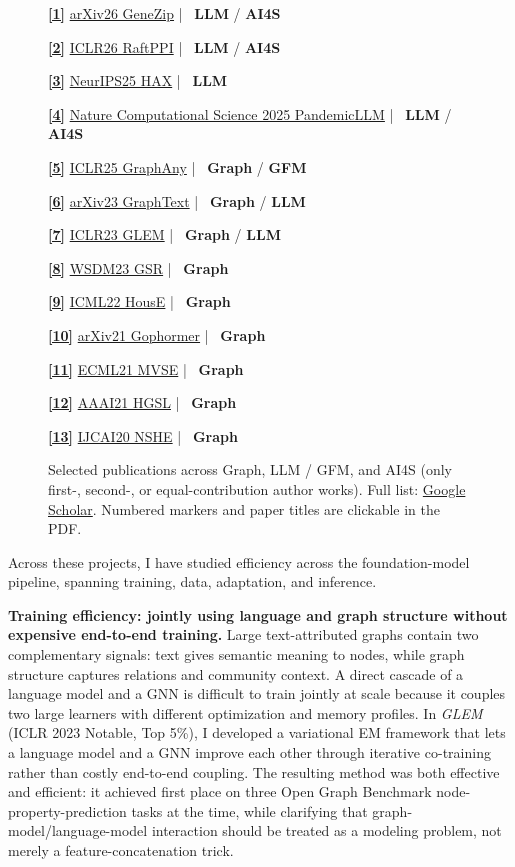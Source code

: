 \documentclass[10pt,letterpaper]{article}
\newcommand{\urlScholar}{https://scholar.google.com/citations?user=Pb_UoYwAAAAJ}
\newcommand{\urlNSHE}{https://www.ijcai.org/proceedings/2020/190}
\newcommand{\urlHGSL}{https://doi.org/10.1609/aaai.v35i5.16600}
\newcommand{\urlHousE}{https://proceedings.mlr.press/v162/li22ab.html}
\newcommand{\urlGophormer}{https://arxiv.org/abs/2110.13094}
\newcommand{\urlMVSE}{https://doi.org/10.1007/978-3-030-86520-7_20}
\newcommand{\urlGSR}{https://doi.org/10.1145/3539597.3570455}
\newcommand{\urlGLEM}{https://openreview.net/forum?id=q0nmYciuuZN}
\newcommand{\urlGraphText}{https://arxiv.org/abs/2310.01089}
\newcommand{\urlGraphAny}{https://openreview.net/forum?id=1Qpt43cqhg}
\newcommand{\urlHAX}{https://arxiv.org/abs/2507.00449}
\newcommand{\urlPandemicLLM}{https://www.nature.com/articles/s43588-025-00798-6}
\newcommand{\urlRaftPPI}{https://openreview.net/forum?id=Dp1RM3gPg8}
\newcommand{\urlGeneZip}{https://arxiv.org/abs/2602.17739}
\newcommand{\topictag}[2]{%
  {\textcolor{#1!70!black}{\textbf{\scriptsize #2}}}%
}
\newcommand{\paperrow}[4]{%
  \noindent\href{#4}{\textcolor{refBlue}{\textbf{[#1]}}} \href{#4}{\textcolor{ink}{#2}} {\color{muted}|}~#3\par
}
\newcommand{\pubgroup}[1]{%
  \vspace{0.12em}{\color{ink}\textbf{#1}}\par\vspace{0.06em}%
}
\newcommand{\papermark}[3]{%
  \node[
    font=\tiny\bfseries,
    text=refBlue,
    fill=white,
    fill opacity=0.92,
    text opacity=1,
    inner xsep=0.7pt,
    inner ysep=0.1pt,
    rounded corners=1pt
  ] at #1 {\href{#2}{\textcolor{refBlue}{[#3]}}};
}
\begin{document}
\begin{figure}[H]
{\begin{minipage}[t]{0.35\linewidth}
\end{minipage}\hspace{0.018\linewidth}%
\begin{minipage}[t]{0.57\linewidth}
\vspace{0pt}
\raggedright
\scriptsize
\setlength{\parskip}{0.03em}
\pubgroup{PhD Publications}
\paperrow{1}{arXiv26 GeneZip}{\topictag{llmOrange}{LLM}/\topictag{aiGreen}{AI4S}}{\urlGeneZip}
\paperrow{2}{ICLR26 RaftPPI}{\topictag{llmOrange}{LLM}/\topictag{aiGreen}{AI4S}}{\urlRaftPPI}
\paperrow{3}{NeurIPS25 HAX}{\topictag{llmOrange}{LLM}}{\urlHAX}
\paperrow{4}{Nature Computational Science 2025 PandemicLLM}{\topictag{llmOrange}{LLM}/\topictag{aiGreen}{AI4S}}{\urlPandemicLLM}
\paperrow{5}{ICLR25 GraphAny}{\topictag{graphBlue}{Graph}/\topictag{llmOrange}{GFM}}{\urlGraphAny}
\paperrow{6}{arXiv23 GraphText}{\topictag{graphBlue}{Graph}/\topictag{llmOrange}{LLM}}{\urlGraphText}
\paperrow{7}{ICLR23 GLEM}{\topictag{graphBlue}{Graph}/\topictag{llmOrange}{LLM}}{\urlGLEM}
\pubgroup{Previous Publications}
\paperrow{8}{WSDM23 GSR}{\topictag{graphBlue}{Graph}}{\urlGSR}
\paperrow{9}{ICML22 HousE}{\topictag{graphBlue}{Graph}}{\urlHousE}
\paperrow{10}{arXiv21 Gophormer}{\topictag{graphBlue}{Graph}}{\urlGophormer}
\paperrow{11}{ECML21 MVSE}{\topictag{graphBlue}{Graph}}{\urlMVSE}
\paperrow{12}{AAAI21 HGSL}{\topictag{graphBlue}{Graph}}{\urlHGSL}
\paperrow{13}{IJCAI20 NSHE}{\topictag{graphBlue}{Graph}}{\urlNSHE}
\end{minipage}
}
\caption{\small Selected publications across Graph, LLM / GFM, and AI4S (only first-, second-, or equal-contribution author works). Full list: \href{\urlScholar}{Google Scholar}. Numbered markers and paper titles are clickable in the PDF.}
\end{figure}
\vspace{-0.8em}

Across these projects, I have studied efficiency across the foundation-model pipeline, spanning training, data, adaptation, and inference.

\textbf{Training efficiency: jointly using language and graph structure without expensive end-to-end training.} Large text-attributed graphs contain two complementary signals: text gives semantic meaning to nodes, while graph structure captures relations and community context. A direct cascade of a language model and a GNN is difficult to train jointly at scale because it couples two large learners with different optimization and memory profiles. In \textit{GLEM}~\cite{glem} (ICLR 2023 Notable, Top 5\%), I developed a variational EM framework that lets a language model and a GNN improve each other through iterative co-training rather than costly end-to-end coupling. The resulting method was both effective and efficient: it achieved first place on three Open Graph Benchmark node-property-prediction tasks at the time, while clarifying that graph-model/language-model interaction should be treated as a modeling problem, not merely a feature-concatenation trick.
\end{document}
